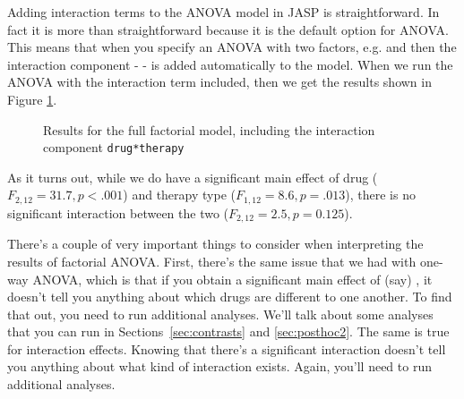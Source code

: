 
Adding interaction terms to the ANOVA model in JASP is straightforward. In fact it is more than straightforward because it is the default option for ANOVA. This means that when you specify an ANOVA with two factors, e.g.  and  then the interaction component -  - is added automatically to the model. When we run the ANOVA with the interaction term included, then we get the results shown in Figure \ref{fig:factorialanova4}. 

\begin{figure}[!htb]
\begin{center}
\caption{Results for the full factorial model, including the interaction component \texttt{drug*therapy}}
\label{fig:factorialanova4}
\HR
\end{center}
\end{figure}

As it turns out, while we do have a significant main effect of drug ($F_{2,12} = 31.7, p <.001$) and therapy type ($F_{1,12} = 8.6, p=.013$), there is no significant interaction between the two ($F_{2,12} = 2.5, p = 0.125$).


There's a couple of very important things to consider when interpreting the results of factorial ANOVA. First, there's the same issue that we had with one-way ANOVA, which is that if you obtain a significant main effect of (say) , it doesn't tell you anything about which drugs are different to one another. To find that out, you need to run additional analyses. We'll talk about some analyses that you can run in Sections~\ref{sec:contrasts} and \ref{sec:posthoc2}. The same is true for interaction effects. Knowing that there's a significant interaction doesn't tell you anything about what kind of interaction exists. Again, you'll need to run additional analyses. 


